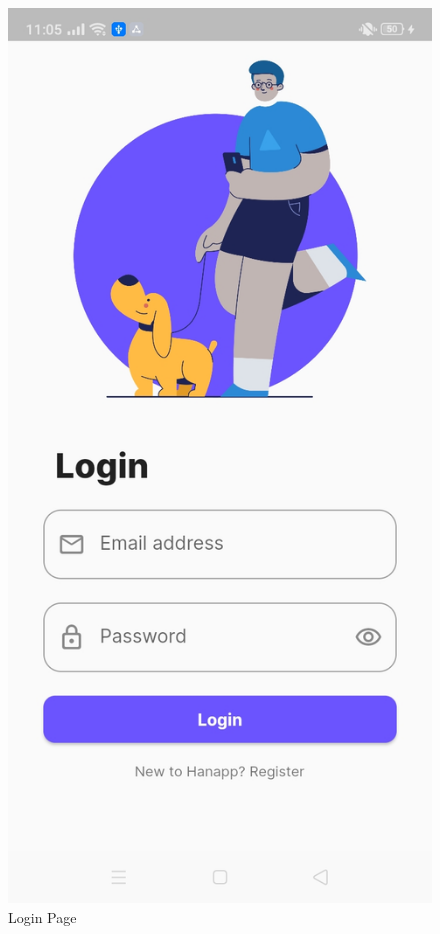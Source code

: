\begin{figure}[!h]
\begin{minipage}[c]{0.50\linewidth}
        \includegraphics[scale=0.15]{figures/Chapter4/Main/Login.jpg}
        \caption{Login Page}
        \label{fig:userLogin}
    \end{minipage}
\end{figure}

